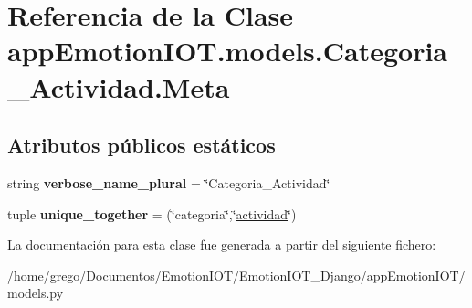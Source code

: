 \hypertarget{classappEmotionIOT_1_1models_1_1Categoria__Actividad_1_1Meta}{}\section{Referencia de la Clase app\+Emotion\+I\+O\+T.\+models.\+Categoria\+\_\+\+Actividad.\+Meta}
\label{classappEmotionIOT_1_1models_1_1Categoria__Actividad_1_1Meta}
\subsection*{Atributos públicos estáticos}
\begin{DoxyCompactItemize}
\item 
string {\bfseries verbose\+\_\+name\+\_\+plural} = \char`\"{}Categoria\+\_\+\+Actividad\char`\"{}\hypertarget{classappEmotionIOT_1_1models_1_1Categoria__Actividad_1_1Meta_a59e885c35586e69cf043dc98cba904a7}{}\label{classappEmotionIOT_1_1models_1_1Categoria__Actividad_1_1Meta_a59e885c35586e69cf043dc98cba904a7}

\item 
tuple {\bfseries unique\+\_\+together} = (\char`\"{}categoria\char`\"{},\char`\"{}\hyperlink{classappEmotionIOT_1_1models_1_1Categoria__Actividad_a274f170aaf89aede3b81f18f75e23dc6}{actividad}\char`\"{})\hypertarget{classappEmotionIOT_1_1models_1_1Categoria__Actividad_1_1Meta_af77f50676e2f5e405c42edc5fbbba2b5}{}\label{classappEmotionIOT_1_1models_1_1Categoria__Actividad_1_1Meta_af77f50676e2f5e405c42edc5fbbba2b5}

\end{DoxyCompactItemize}


La documentación para esta clase fue generada a partir del siguiente fichero\+:\begin{DoxyCompactItemize}
\item 
/home/grego/\+Documentos/\+Emotion\+I\+O\+T/\+Emotion\+I\+O\+T\+\_\+\+Django/app\+Emotion\+I\+O\+T/models.\+py\end{DoxyCompactItemize}
